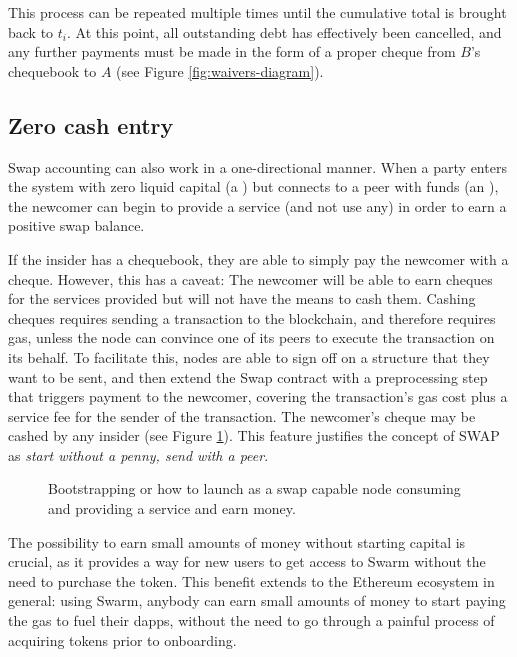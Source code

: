This process can be repeated multiple times until the cumulative total is brought back to $t_i$. At this point, all outstanding debt has effectively been cancelled, and any further payments must be made in the form of a proper cheque from $B$'s chequebook to $A$ (see Figure \ref{fig:waivers-diagram}).



\subsection{Zero cash entry\statusgreen}\label{sec:zero-cash-entry}


Swap accounting can also work in a one-directional manner. When a party enters the system with zero liquid capital (a ) but connects to a peer with funds (an ), the newcomer can begin to provide a service (and not use any) in order to earn a positive swap balance. 

If the insider has a chequebook, they are able to simply pay the newcomer with a cheque. However, this has a caveat: The newcomer will be able to earn cheques for the services provided but will not have the means to cash them. Cashing cheques requires sending a transaction to the blockchain, and therefore requires gas, unless the node can convince one of its peers to execute the transaction on its behalf. To facilitate this, nodes are able to sign off on a structure that they want to be sent, and then extend the Swap contract with a preprocessing step that triggers payment to the newcomer, covering the transaction’s gas cost plus a service fee for the sender of the transaction. The newcomer's cheque may be cashed by any insider (see Figure \ref{fig:zero-cash-entry}). This feature justifies the concept of SWAP as \emph{start without a penny, send with a peer}.

\begin{figure}[htbp]
\centering

\caption[Zero cash entry \statusorange]{Bootstrapping or how to launch as a swap capable node consuming and providing a
service and earn money.}
\label{fig:zero-cash-entry}
\end{figure}

The possibility to earn small amounts of money without starting capital is crucial, as it provides a way for new users to get access to Swarm without the need to purchase the token. This benefit extends to the Ethereum ecosystem in general: using Swarm, anybody can earn small amounts of money to start paying the gas to fuel their dapps, without the need to go through a painful process of acquiring tokens prior to onboarding. 


